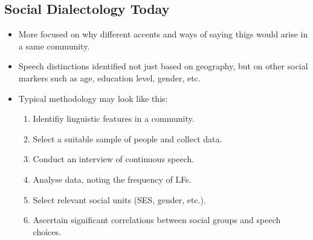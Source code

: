 \documentclass[../main.tex]{subfiles}
\begin{document}
        \subsection{Social Dialectology Today}
        \begin{itemize}
            \item More focused on why different accents and ways of saying thigs would arise in a same community.
            \item Speech distinctions identified not just based on geography, but on other social markers such as age, education level, gender, etc.
            \item Typical methodology may look like this: \begin{enumerate}
                \item Identifiy linguistic features in a community.
                \item Select a suitable sample of people and collect data.
                \item Conduct an interview of continuous speech.
                \item Analyse data, noting the frequency of LFs.
                \item Select relevant social units (SES, gender, etc.).
                \item Ascertain significant correlations between social groups and speech choices.
            \end{enumerate}
        \end{itemize}

        
\end{document}
